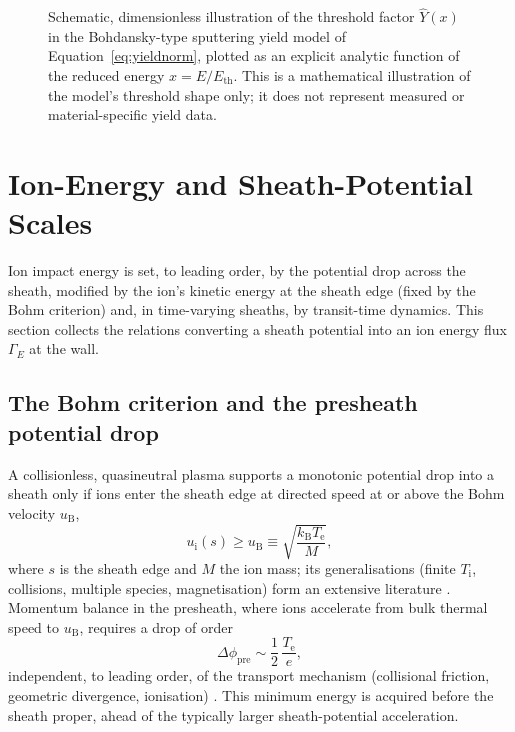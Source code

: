 \begin{figure}[htbp]
\centering
{}
\caption{Schematic, dimensionless illustration of the threshold factor $\hat Y(x)$ in the Bohdansky-type sputtering yield model of Equation~\eqref{eq:yieldnorm}, plotted as an explicit analytic function of the reduced energy $x=E/E_{\mathrm{th}}$. This is a mathematical illustration of the model's threshold shape only; it does not represent measured or material-specific yield data.}
\label{fig:yield}
\end{figure}

\section{Ion-Energy and Sheath-Potential Scales}
\label{app:data:energy}

Ion impact energy is set, to leading order, by the potential drop across the sheath, modified by the ion's kinetic energy at the sheath edge (fixed by the Bohm criterion) and, in time-varying sheaths, by transit-time dynamics. This section collects the relations converting a sheath potential into an ion energy flux $\Gamma_E$ at the wall.

\subsection{The Bohm criterion and the presheath potential drop}

A collisionless, quasineutral plasma supports a monotonic potential drop into a sheath only if ions enter the sheath edge at directed speed at or above the Bohm velocity $u_{\mathrm{B}}$,
\begin{equation}
u_{\mathrm{i}}(s) \geq u_{\mathrm{B}} \equiv \sqrt{\frac{k_{\mathrm{B}} T_{\mathrm{e}}}{M}} ,
\label{eq:bohmcrit}
\end{equation}
where $s$ is the sheath edge and $M$ the ion mass; its generalisations (finite $T_{\mathrm{i}}$, collisions, multiple species, magnetisation) form an extensive literature \cite{ref0001,ref0017}. Momentum balance in the presheath, where ions accelerate from bulk thermal speed to $u_{\mathrm{B}}$, requires a drop of order
\begin{equation}
\Delta \phi_{\mathrm{pre}} \sim \frac{1}{2}\,\frac{T_{\mathrm{e}}}{e},
\label{eq:presheath}
\end{equation}
independent, to leading order, of the transport mechanism (collisional friction, geometric divergence, ionisation) \cite{ref0013}. This minimum energy is acquired before the sheath proper, ahead of the typically larger sheath-potential acceleration.


